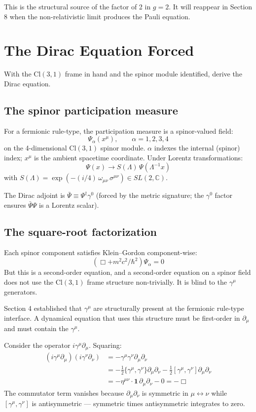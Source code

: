 \documentclass[11pt,a4paper]{article}
\begin{document}
This is the structural source of the factor of 2 in $g = 2$. It will reappear in Section 8 when the non-relativistic limit produces the Pauli equation.

\section{The Dirac Equation Forced}

With the $\mathrm{Cl}(3,1)$ frame in hand and the spinor module identified, derive the Dirac equation.

\subsection{The spinor participation measure}

For a fermionic rule-type, the participation measure is a spinor-valued field:
\[
\Psi_\alpha(x^\mu), \qquad \alpha = 1, 2, 3, 4
\]
on the 4-dimensional $\mathrm{Cl}(3,1)$ spinor module. $\alpha$ indexes the internal (spinor) index; $x^\mu$ is the ambient spacetime coordinate. Under Lorentz transformations:
\[
\Psi(x) \to S(\Lambda)\, \Psi(\Lambda^{-1} x)
\]
with $S(\Lambda) = \exp(-(i/4)\, \omega_{\mu\nu}\, \sigma^{\mu\nu}) \in SL(2, \mathbb{C})$.

The Dirac adjoint is $\bar\Psi \equiv \Psi^\dagger\gamma^0$ (forced by the metric signature; the $\gamma^0$ factor ensures $\bar\Psi\Psi$ is a Lorentz scalar).

\subsection{The square-root factorization}

Each spinor component satisfies Klein--Gordon component-wise:
\[
(\Box + m^{2}c^{2}/\hbar^{2})\Psi_\alpha = 0
\]
But this is a second-order equation, and a second-order equation on a spinor field does not use the $\mathrm{Cl}(3,1)$ frame structure non-trivially. It is blind to the $\gamma^\mu$ generators.

Section 4 established that $\gamma^\mu$ are structurally present at the fermionic rule-type interface. A dynamical equation that uses this structure must be first-order in $\partial_\mu$ and must contain the $\gamma^\mu$.

Consider the operator $i\gamma^\mu\partial_\mu$. Squaring:
\begin{align*}
(i\gamma^\mu\partial_\mu)(i\gamma^\nu\partial_\nu) &= -\gamma^\mu\gamma^\nu\partial_\mu\partial_\nu \\
&= -\tfrac{1}{2}\{\gamma^\mu, \gamma^\nu\}\partial_\mu\partial_\nu - \tfrac{1}{2}[\gamma^\mu, \gamma^\nu]\partial_\mu\partial_\nu \\
&= -\eta^{\mu\nu}\cdot\mathbf{1}\, \partial_\mu\partial_\nu - 0 = -\Box
\end{align*}
The commutator term vanishes because $\partial_\mu\partial_\nu$ is symmetric in $\mu\leftrightarrow\nu$ while $[\gamma^\mu, \gamma^\nu]$ is antisymmetric --- symmetric times antisymmetric integrates to zero.
\end{document}
